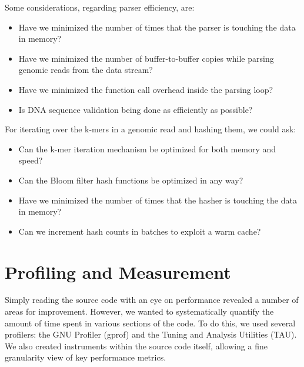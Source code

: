 \documentclass{article}
\begin{document}
Some considerations, regarding parser efficiency, are:
\begin{itemize}
\item Have we minimized the number of times that the parser is touching the data in memory?
\item Have we minimized the number of buffer-to-buffer copies while parsing genomic reads from the data stream?
\item Have we minimized the function call overhead inside the parsing loop?
\item Is DNA sequence validation being done as efficiently as possible?
\end{itemize}

For iterating over the k-mers in a genomic read and hashing them, we could ask:
\begin{itemize}
\item Can the k-mer iteration mechanism be optimized for both memory and speed?
\item Can the Bloom filter hash functions be optimized in any way?
\item Have we minimized the number of times that the hasher is touching the data in memory?
\item Can we increment hash counts in batches to exploit a warm cache?
\end{itemize}


\section{Profiling and Measurement}

Simply reading the source code with an eye on performance revealed a number of areas for improvement. However, we wanted to systematically quantify the amount of time spent in various sections of the code. To do this, we used several profilers: the GNU Profiler (gprof) and the Tuning and Analysis Utilities (TAU). We also created instruments within the source code itself, allowing a fine granularity view of key performance metrics.
\end{document}
